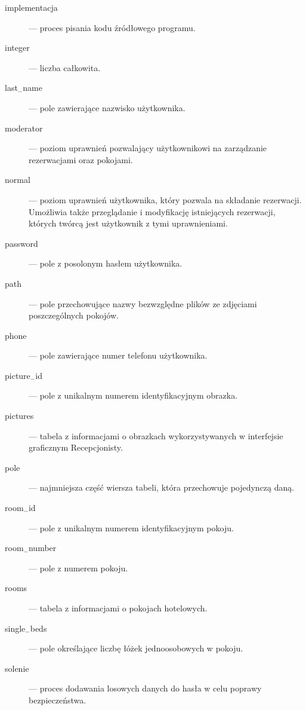 \documentclass [11pt, a4paper, leqno] {article}
\begin{document}
\begin{description}
\item[implementacja] --- proces pisania kodu źródłowego programu.

\item[integer] --- liczba całkowita.

\item[last$_{-}$name] --- pole zawierające nazwisko użytkownika.

\item[moderator] --- poziom uprawnień pozwalający użytkownikowi na zarządzanie rezerwacjami oraz pokojami.

\item[normal] --- poziom uprawnień użytkownika, który pozwala na składanie rezerwacji. Umożliwia także przeglądanie i modyfikację istniejących rezerwacji, których twórcą jest użytkownik z tymi uprawnieniami.

\item[password] --- pole z posolonym hasłem użytkownika.

\item[path] --- pole przechowujące nazwy bezwzględne plików ze zdjęciami poszczególnych pokojów.

\item[phone] --- pole zawierające numer telefonu użytkownika.

\item[picture$_{-}$id] --- pole z unikalnym numerem identyfikacyjnym obrazka.

\item[pictures] --- tabela z informacjami o obrazkach wykorzystywanych w interfejsie graficznym Recepcjonisty.

\item[pole] --- najmniejsza część wiersza tabeli, która przechowuje pojedynczą daną.

\item[room$_{-}$id] --- pole z unikalnym numerem identyfikacyjnym pokoju.

\item[room$_{-}$number] --- pole z numerem pokoju.

\item[rooms] --- tabela z informacjami o pokojach hotelowych.

\item[single$_{-}$beds] --- pole określające liczbę łóżek jednoosobowych w pokoju.

\item[solenie] --- proces dodawania losowych danych do hasła w celu poprawy bezpieczeństwa.


\end{description}
\end{document}
